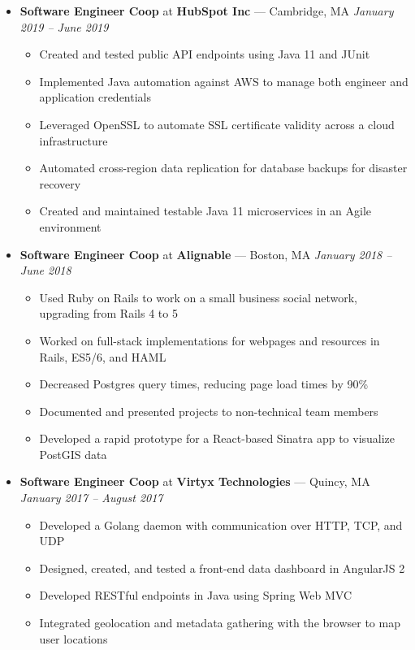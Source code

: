 \documentclass{article}
\begin{document}
\begin{itemize}[label={},leftmargin=*]
  \item \textbf{Software Engineer Coop} at \textbf{HubSpot Inc} --- Cambridge, MA \hfill {\em January 2019 -- June 2019}
  \begin{itemize}[label={$\bullet$}]
    \item Created and tested public API endpoints using Java 11 and JUnit
    \item Implemented Java automation against AWS to manage both engineer and application credentials
    \item Leveraged OpenSSL to automate SSL certificate validity across a cloud infrastructure
    \item Automated cross-region data replication for database backups for disaster recovery
    \item Created and maintained testable Java 11 microservices in an Agile environment
  \end{itemize}

  \item \textbf{Software Engineer Coop} at \textbf{Alignable} --- Boston, MA \hfill {\em January 2018 -- June 2018}
  \begin{itemize}[label={$\bullet$}]
    \item Used Ruby on Rails to work on a small business social network, upgrading from Rails 4 to 5
    \item Worked on full-stack implementations for webpages and resources in Rails, ES5/6, and HAML
    \item Decreased Postgres query times, reducing page load times by 90\%
    \item Documented and presented projects to non-technical team members
    \item Developed a rapid prototype for a React-based Sinatra app to visualize PostGIS data
  \end{itemize}

  \item \textbf{Software Engineer Coop} at \textbf{Virtyx Technologies} --- Quincy, MA \hfill {\em January 2017 -- August 2017}
  \begin{itemize}[label={$\bullet$}]
    \item Developed a Golang daemon with communication over HTTP, TCP, and UDP
    \item Designed, created, and tested a front-end data dashboard in AngularJS 2
    \item Developed RESTful endpoints in Java using Spring Web MVC
    \item Integrated geolocation and metadata gathering with the browser to map user locations
  \end{itemize}
\end{itemize}
\end{document}
